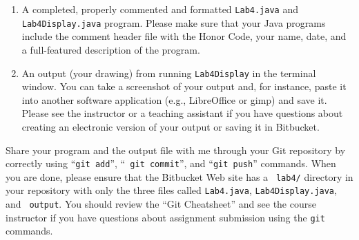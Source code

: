 \begin{enumerate}

  \item A completed, properly commented and formatted {\tt Lab4.java} and {\tt Lab4Display.java} program. Please
    make sure that your Java programs include the comment header file with the Honor Code, your name, date, and
    a full-featured description of the program.

  \item An output (your drawing) from running {\tt Lab4Display} in the terminal window. You can take a screenshot of
    your output and, for instance, paste it into another software application (e.g., LibreOffice or gimp) and save it.
    Please see the instructor or a teaching assistant if you have questions about creating an electronic version of your
    output or saving it in Bitbucket.

\end{enumerate}

\vspace{-0.1in}

Share your program and the output file with me through your Git repository by correctly using ``{\tt git add}'', ``{\tt
git commit}'', and ``{\tt git push}'' commands. When you are done, please ensure that the Bitbucket Web site has a {\tt
lab4/} directory in your repository with only the three files called {\tt Lab4.java}, {\tt Lab4Display.java}, and {\tt
output}. You should review the ``Git Cheatsheet'' and see the course instructor if you have questions about assignment
submission using the {\tt git} commands.


